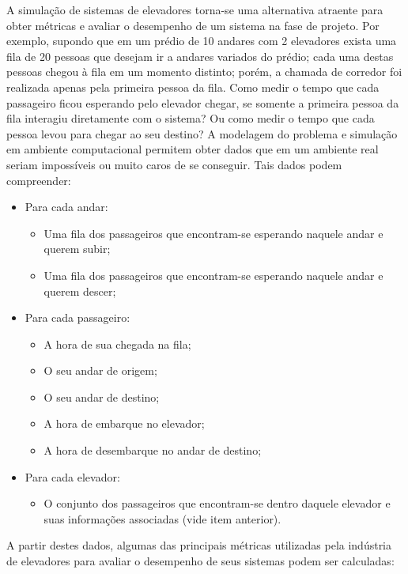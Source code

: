 A simulação de sistemas de elevadores torna-se uma alternativa atraente para
obter métricas e avaliar o desempenho de um sistema na fase de projeto. Por
exemplo, supondo que em um prédio de 10 andares com 2 elevadores exista uma fila
de 20 pessoas que desejam ir a andares variados do prédio; cada uma destas
pessoas chegou à fila em um momento distinto; porém, a chamada de corredor foi
realizada apenas pela primeira pessoa da fila. Como medir o tempo que cada
passageiro ficou esperando pelo elevador chegar, se somente a primeira
pessoa da fila interagiu diretamente com o sistema? Ou como medir o tempo que
cada pessoa levou para chegar ao seu destino? A modelagem do problema e
simulação em ambiente computacional permitem obter dados que em um ambiente real
seriam impossíveis ou muito caros de se conseguir. Tais dados podem compreender:

\begin{itemize}\setlength\itemsep{0mm}
  \item Para cada andar:
  \begin{itemize}\setlength\itemsep{0mm}
    \item Uma fila dos passageiros que encontram-se esperando naquele andar e querem subir;
    \item Uma fila dos passageiros que encontram-se esperando naquele andar e querem descer;
  \end{itemize}
  \item Para cada passageiro:
  \begin{itemize}\setlength\itemsep{0mm}
    \item A hora de sua chegada na fila;
    \item O seu andar de origem;
    \item O seu andar de destino;
    \item A hora de embarque no elevador;
    \item A hora de desembarque no andar de destino;
  \end{itemize}
  \item Para cada elevador:
  \begin{itemize}\setlength\itemsep{0mm}
    \item O conjunto dos passageiros que encontram-se dentro daquele elevador e suas informações associadas (vide item anterior).
  \end{itemize}
\end{itemize}

A partir destes dados, algumas das principais métricas utilizadas pela indústria
de elevadores para avaliar o desempenho de seus sistemas podem ser calculadas:

